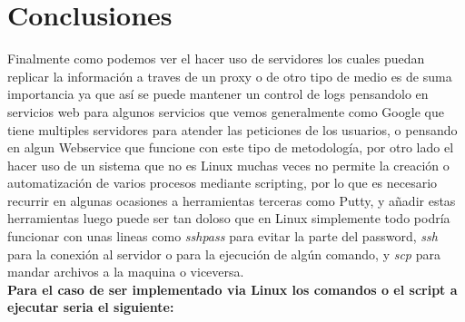 \documentclass[10pt,executivepaper]{article}
\begin{document}
\section{Conclusiones}
Finalmente como podemos ver el hacer uso de servidores los cuales puedan replicar la información a traves de un proxy o de otro tipo de medio es de suma importancia ya que así se puede mantener un control de logs pensandolo en servicios web para algunos servicios que vemos generalmente como Google que tiene multiples servidores para atender las peticiones de los usuarios, o pensando en algun Webservice que funcione con este tipo de metodología, por otro lado el hacer uso de un sistema que no es Linux muchas veces no permite la creación o automatización de varios procesos mediante scripting, por lo que es necesario recurrir en algunas ocasiones a herramientas terceras como Putty, y añadir estas herramientas luego puede ser tan doloso que en Linux simplemente todo podría funcionar con unas lineas como \textit{sshpass} para evitar la parte del password, \textit{ssh} para la conexión al servidor o para la ejecución de algún comando, y \textit{scp} para mandar archivos a la maquina o viceversa.
\\\vspace{0.15cm}
\textbf{Para el caso de ser implementado via Linux los comandos o el script a ejecutar seria el siguiente:}

\end{document}
